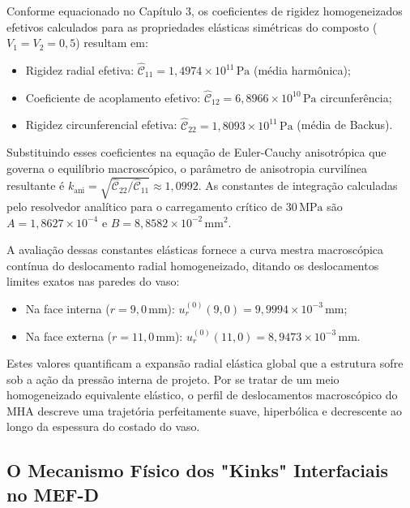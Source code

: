 Conforme equacionado no Capítulo 3, os coeficientes de rigidez homogeneizados efetivos calculados para as propriedades elásticas simétricas do composto ($V_1 = V_2 = 0,5$) resultam em:
\begin{itemize}
  \item Rigidez radial efetiva: $\hat{\mathcal{C}}_{11} = 1,4974 \times 10^{11} \, \text{Pa}$ (média harmônica);
  \item Coeficiente de acoplamento efetivo: $\hat{\mathcal{C}}_{12} = 6,8966 \times 10^{10} \, \text{Pa}$ circunferência;
  \item Rigidez circunferencial efetiva: $\hat{\mathcal{C}}_{22} = 1,8093 \times 10^{11} \, \text{Pa}$ (média de Backus).
\end{itemize}

Substituindo esses coeficientes na equação de Euler-Cauchy anisotrópica que governa o equilíbrio macroscópico, o parâmetro de anisotropia curvilínea resultante é $k_{\text{ani}} = \sqrt{\hat{\mathcal{C}}_{22} / \hat{\mathcal{C}}_{11}} \approx 1,0992$. As constantes de integração calculadas pelo resolvedor analítico para o carregamento crítico de $30 \, \text{MPa}$ são $A = 1,8627 \times 10^{-4}$ e $B = 8,8582 \times 10^{-2} \, \text{mm}^2$.

A avaliação dessas constantes elásticas fornece a curva mestra macroscópica contínua do deslocamento radial homogeneizado, ditando os deslocamentos limites exatos nas paredes do vaso:
\begin{itemize}
  \item Na face interna ($r = 9,0 \, \text{mm}$): $u_r^{(0)} (9,0) = 9,9994 \times 10^{-3} \, \text{mm}$;
  \item Na face externa ($r = 11,0 \, \text{mm}$): $u_r^{(0)} (11,0) = 8,9473 \times 10^{-3} \, \text{mm}$.
\end{itemize}

Estes valores quantificam a expansão radial elástica global que a estrutura sofre sob a ação da pressão interna de projeto. Por se tratar de um meio homogeneizado equivalente elástico, o perfil de deslocamentos macroscópico do MHA descreve uma trajetória perfeitamente suave, hiperbólica e decrescente ao longo da espessura do costado do vaso.

\subsection{O Mecanismo Físico dos "Kinks" Interfaciais no MEF-D}

